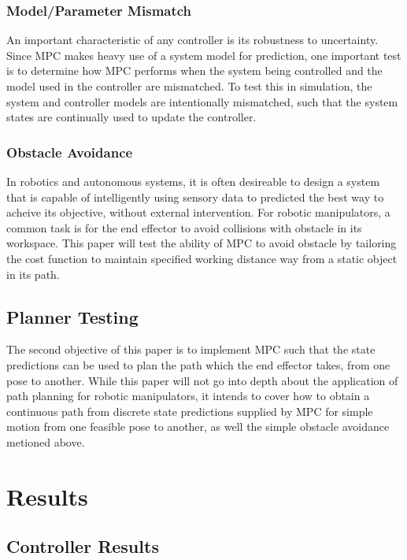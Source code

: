 \documentclass[journal]{IEEEtran}
\begin{document}
\subsubsection{Model/Parameter Mismatch}
An important characteristic of any controller is its robustness to uncertainty. Since MPC makes heavy use of a system model for prediction, one important test is to determine how MPC performs when the system being controlled and the model used in the controller are mismatched. To test this in simulation, the system and controller models are intentionally mismatched, such that the system states are continually used to update the controller.\\

\subsubsection{Obstacle Avoidance}
In robotics and autonomous systems, it is often desireable to design a system that is capable of intelligently using sensory data to predicted the best way to acheive its objective, without external intervention. For robotic manipulators, a common task is for the end effector to avoid collisions with obstacle in its workspace. This paper will test the ability of MPC to avoid obstacle by tailoring the cost function to maintain specified working distance way from a static object in its path.

\subsection{Planner Testing}

The second objective of this paper is to implement MPC such that the state predictions can be used to plan the path which the end effector takes, from one pose to another. While this paper will not go into depth about the application of path planning for robotic manipulators, it intends to cover how to obtain a continuous path from discrete state predictions supplied by MPC for simple motion from one feasible pose to another, as well the simple obstacle avoidance metioned above.

\section{Results}


\subsection{Controller Results}
\end{document}
